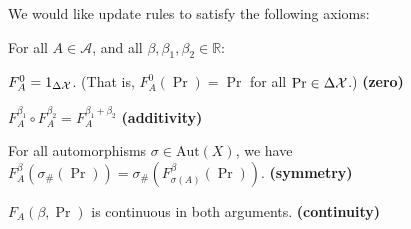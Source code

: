 \documentclass{article}
\begin{document}
We would like update rules to satisfy the following axioms:

For all $A \in \mathcal A$, and all $\beta,\beta_1, \beta_2 \in \mathbb R$:

% 
% 
% 
\begin{URaxioms}
    \item  $F^{0}_A  = {1}_{\Delta\mathcal X}$. (That is, $F^{0}_A(\Pr) = \Pr$ for all $\Pr \in \Delta\mathcal X$.)
        \hfill \textbf{(zero)} \label{ax:zero}
    \item $F^{\beta_1}_A \circ F^{\beta_2}_A = F^{\beta_1 + \beta_2}_A$
        \hfill \textbf{(additivity)} \label{ax:additivity}
    \item For all automorphisms $\sigma \in \mathrm{Aut}(X)$, we have \\
        $F^\beta_A(\sigma_\#(\Pr)) = \sigma_\#(F^\beta_{\sigma(A)}(\Pr))$.
        \hfill \textbf{(symmetry)} \label{ax:symmetry}
    \item $F_A(\beta, \Pr)$ is continuous in both arguments.
        \hfill \textbf{(continuity)} \label{ax:continuity}
\end{URaxioms}
\end{document}

